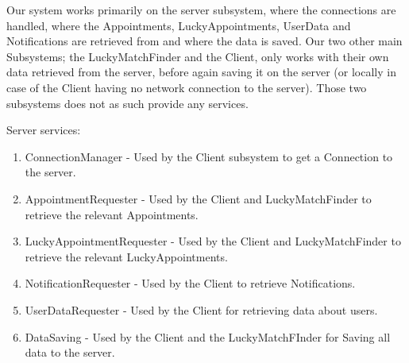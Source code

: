Our system works primarily on the server subsystem, where the connections are handled, where the Appointments, LuckyAppointments, UserData and Notifications are retrieved from  and where the data is saved. Our two other main Subsystems; the LuckyMatchFinder and the Client, only works with their own data retrieved from the server, before again saving it on the server (or locally in case of the Client having no network connection to the server). Those two subsystems does not as such provide any services. 

Server services:
\begin{enumerate}
\item ConnectionManager - Used by the Client subsystem to get a Connection to the server.
\item AppointmentRequester - Used by the Client and LuckyMatchFinder to retrieve the relevant Appointments.
\item LuckyAppointmentRequester - Used by the Client and LuckyMatchFinder to retrieve the relevant LuckyAppointments.
\item NotificationRequester - Used by the Client to retrieve Notifications.
\item UserDataRequester - Used by the Client for retrieving data about users.
\item DataSaving -  Used by the Client and the LuckyMatchFInder for Saving all data to the server.
\end{enumerate}
